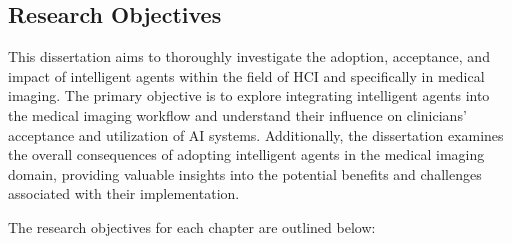\subsection{Research Objectives}
\label{sec:chap001002002}

This dissertation aims to thoroughly investigate the adoption, acceptance, and impact of intelligent agents within the field of \ac{HCI} and specifically in medical imaging.
The primary objective is to explore integrating intelligent agents into the medical imaging workflow and understand their influence on clinicians' acceptance and utilization of \ac{AI} systems.
Additionally, the dissertation examines the overall consequences of adopting intelligent agents in the medical imaging domain, providing valuable insights into the potential benefits and challenges associated with their implementation.

\vspace{2.00mm}

\noindent
The research objectives for each chapter are outlined below:

\vspace{1.00mm}

